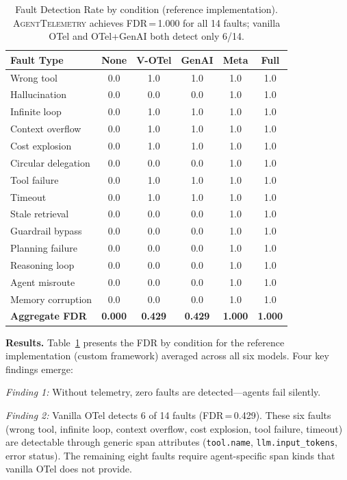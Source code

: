 \documentclass[sigplan,10pt,screen]{acmart}
\begin{document}
\begin{table}[t]
\centering
\small
\caption{Fault Detection Rate by condition (reference implementation).
\textsc{AgentTelemetry} achieves FDR\,=\,1.000 for all 14 faults;
vanilla OTel and OTel+GenAI both detect only 6/14.}
\label{tab:fdr}
\begin{tabular}{@{}lccccc@{}}
\toprule
\textbf{Fault Type} & \textbf{None} & \textbf{V-OTel} & \textbf{GenAI} & \textbf{Meta} & \textbf{Full} \\
\midrule
Wrong tool          & 0.0 & 1.0 & 1.0 & 1.0 & 1.0 \\
Hallucination       & 0.0 & 0.0 & 0.0 & 1.0 & 1.0 \\
Infinite loop       & 0.0 & 1.0 & 1.0 & 1.0 & 1.0 \\
Context overflow    & 0.0 & 1.0 & 1.0 & 1.0 & 1.0 \\
Cost explosion      & 0.0 & 1.0 & 1.0 & 1.0 & 1.0 \\
Circular delegation & 0.0 & 0.0 & 0.0 & 1.0 & 1.0 \\
Tool failure        & 0.0 & 1.0 & 1.0 & 1.0 & 1.0 \\
Timeout             & 0.0 & 1.0 & 1.0 & 1.0 & 1.0 \\
\midrule
Stale retrieval     & 0.0 & 0.0 & 0.0 & 1.0 & 1.0 \\
Guardrail bypass    & 0.0 & 0.0 & 0.0 & 1.0 & 1.0 \\
Planning failure    & 0.0 & 0.0 & 0.0 & 1.0 & 1.0 \\
Reasoning loop      & 0.0 & 0.0 & 0.0 & 1.0 & 1.0 \\
Agent misroute      & 0.0 & 0.0 & 0.0 & 1.0 & 1.0 \\
Memory corruption   & 0.0 & 0.0 & 0.0 & 1.0 & 1.0 \\
\midrule
\textbf{Aggregate FDR} & \textbf{0.000} & \textbf{0.429} & \textbf{0.429} & \textbf{1.000} & \textbf{1.000} \\
\bottomrule
\end{tabular}
\end{table}

\textbf{Results.}  Table~\ref{tab:fdr} presents the FDR by condition
for the reference implementation (custom framework) averaged across all
six models.  Four key findings emerge:

\emph{Finding 1:} Without telemetry, zero faults are detected---agents
fail silently.

\emph{Finding 2:} Vanilla OTel detects 6 of 14 faults
(FDR\,=\,0.429).  These six faults (wrong tool, infinite loop,
context overflow, cost explosion, tool failure, timeout) are detectable
through generic span attributes (\texttt{tool.name},
\texttt{llm.input\_tokens}, error status).  The remaining eight faults
require agent-specific span kinds that vanilla OTel does not provide.
\end{document}
